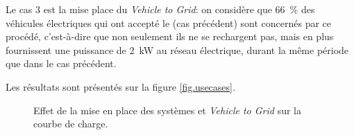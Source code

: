 				Le cas 3 est la mise place du \emph{Vehicle to Grid}: on considère que \SI{66}{\percent} des véhicules électriques qui ont accepté le \smartgrid{} (cas précédent) sont concernés par ce procédé, c'est-à-dire que non seulement ils ne se rechargent pas, mais en plus fournissent une puissance de \SI{2}{\kilo\watt} au réseau électrique, durant la même période que dans le cas précédent.
				
				Les résultats sont présentés sur la figure \vref{fig.usecases}.
				
				\begin{figure}[!h]
					\centering
					\caption{Effet de la mise en place des systèmes \smartgrid{} et \emph{Vehicle to Grid} sur la courbe de charge. \label{fig.usecases}}
				\end{figure}

		
